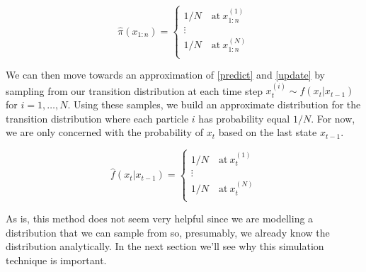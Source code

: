 \documentclass{article}
\begin{document}
\begin{equation}
\widehat{\pi}(x_{1:n}) = \begin{cases}
1/N \quad \text{at} \ x_{1:n}^{(1)} \\
\vdots \\
1/N \quad \text{at} \ x_{1:n}^{(N)} \\
\end{cases}
\end{equation}

We can then move towards an approximation of \eqref{predict} and \eqref{update} by sampling from our transition distribution at each time step $x_{t}^{(i)} \sim f(x_t|x_{t-1})$ for $i = 1,\dots,N$. Using these samples, we build an approximate distribution for the transition distribution where each particle $i$ has probability equal $1/N$. For now, we are only concerned with the probability of $x_t$ based on the last state $x_{t-1}$.

\begin{equation}
\widehat{f}(x_t|x_{t-1}) = \begin{cases}
1/N \quad \text{at} \ x_{t}^{(1)} \\
\vdots \\
1/N \quad \text{at} \ x_{t}^{(N)} \\
\end{cases}
\end{equation}

As is, this method does not seem very helpful since we are modelling a distribution that we can sample from so, presumably, we already know the distribution analytically. In the next section we'll see why this simulation technique is important.


\end{document}
